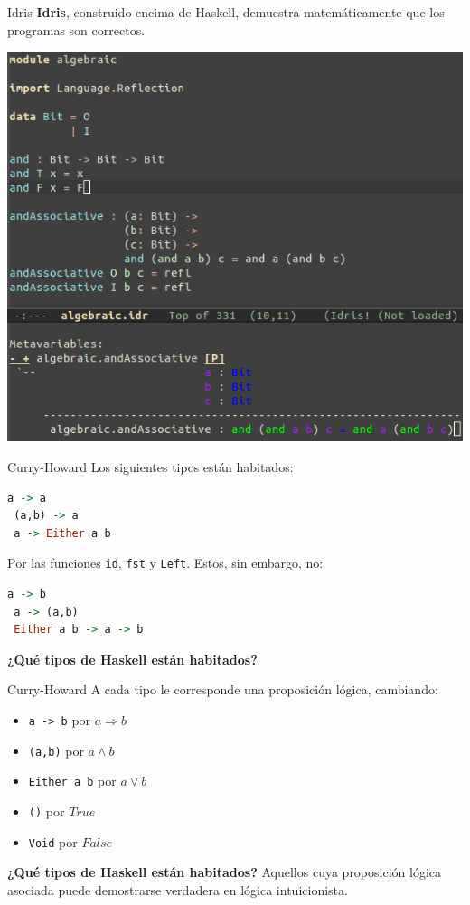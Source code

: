 \begin{frame}[fragile]{Idris}
  \textbf{Idris}, construido encima de Haskell, demuestra
  matemáticamente que los
  programas son correctos.

  \begin{center}
  \includegraphics[scale=0.28]{./images/idris.png}
  \end{center}
\end{frame}


\begin{frame}[fragile]{Curry-Howard}
 Los siguientes tipos están habitados:
 \begin{lstlisting}[language=haskell]
 a -> a
 (a,b) -> a
 a -> Either a b
 \end{lstlisting}
 Por las funciones \texttt{id}, \texttt{fst} y \texttt{Left}.
 Estos, sin embargo, no:
 \begin{lstlisting}[language=haskell]
 a -> b
 a -> (a,b)
 Either a b -> a -> b
 \end{lstlisting}

 \textbf{¿Qué tipos de Haskell están habitados?}
\end{frame}


\begin{frame}[fragile]{Curry-Howard}
 A cada tipo le corresponde una proposición lógica, cambiando:
 \begin{itemize}
  \item \texttt{a -> b} por $a \Rightarrow b$
  \item \texttt{(a,b)} por $a \wedge b$
  \item \texttt{Either a b} por $a \vee b$
  \item \texttt{()} por $True$
  \item \texttt{Void} por $False$
 \end{itemize}

 \espacio
 \textbf{¿Qué tipos de Haskell están habitados?} Aquellos cuya
 proposición lógica asociada puede demostrarse verdadera en lógica
 intuicionista.
\end{frame}

